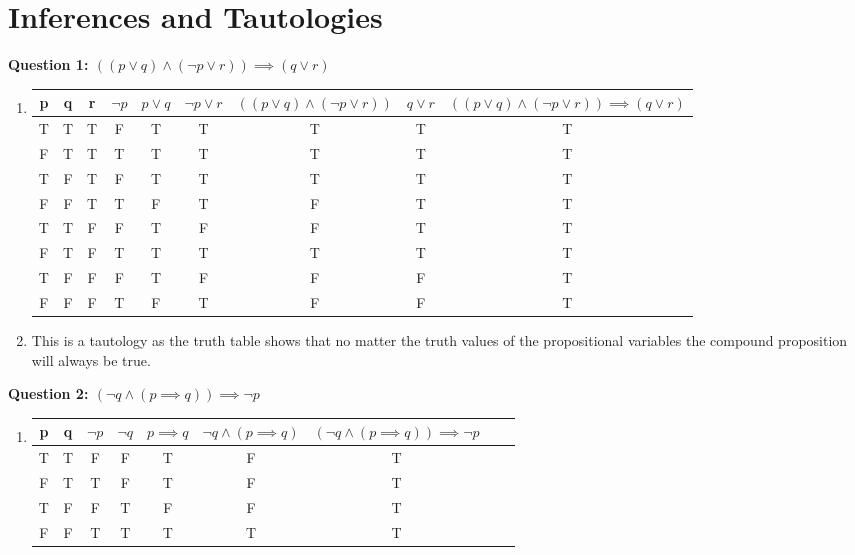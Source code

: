 \documentclass[11pt]{article}
\begin{document}
\begin{enumerate}
\begin{enumerate}[label=(\alph*)]
\end{enumerate}

\section{\textbf{Inferences and Tautologies}}

\textbf{Question 1: $(( p \lor q) \land (\neg p \lor r)) \implies (q \lor r)$}

\begin{enumerate}[label=(\alph*)]
\item
\begin{center}
\begin{tabular}{ |c|c|c|c|c|c|c|c|c| }
 \hline
 p & q & r & $\neg p$ & $p \lor q$ & $\neg p \lor r$ & $(( p \lor q) \land (\neg p \lor r))$ & $q \lor r$ & $(( p \lor q) \land (\neg p \lor r)) \implies (q \lor r)$  \\
 \hline
 T & T & T & F & T & T & T & T & T \\
 F & T & T & T & T & T & T & T & T \\
 T & F & T & F & T & T & T & T & T \\
 F & F & T & T & F & T & F & T & T \\
 T & T & F & F & T & F & F & T & T \\
 F & T & F & T & T & T & T & T & T \\
 T & F & F & F & T & F & F & F & T \\
 F & F & F & T & F & T & F & F & T \\
 \hline

\end{tabular}
\end{center}
\item 
This is a tautology as the truth table shows that no matter the truth values of the propositional variables the compound proposition will always be true.

\end{enumerate}

\textbf{Question 2: $(\neg q \land (p \implies q)) \implies \neg p$}

\begin{enumerate}[label=(\alph*)]
\item
\begin{center}
\begin{tabular}{ |c|c|c|c|c|c|c|c|c| }
 \hline
 p & q & $\neg p$ & $\neg q$ & $p \implies q$ & $\neg q \land (p \implies q)$ & $(\neg q \land (p \implies q)) \implies \neg p$ \\
 \hline
 T & T & F & F & T & F & T \\
 F & T & T & F & T & F & T \\
 T & F & F & T & F & F & T \\
 F & F & T & T & T & T & T \\


\end{tabular}
\end{center}
\end{enumerate}
\end{enumerate}
\end{document}
